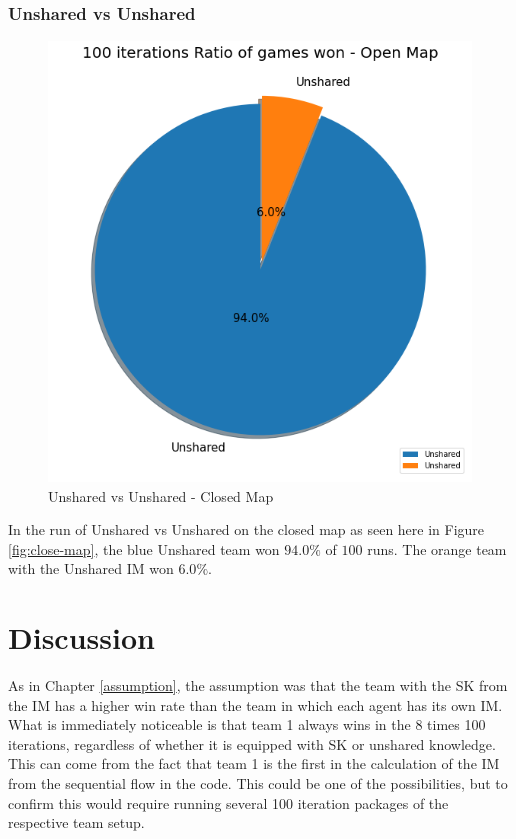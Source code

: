 \documentclass[]{report}
\begin{document}
		\subsection{Unshared vs Unshared}
		\begin{figure}[h!]
			\centering
			\includegraphics[width=0.9\linewidth]{"Images/100 Games Unshared vs Unshared Close Map"}
			\caption[Unshared vs Unshared - Closed Map]{Unshared vs Unshared - Closed Map}
			\label{fig:100-games-unshared-vs-unshared-close-map}
		\end{figure}
			In the run of Unshared vs Unshared on the closed map as seen here in Figure \ref{fig:close-map}, the blue Unshared team won $94.0\%$ of $100$ runs. The orange team with the Unshared \ac{IM} won $6.0\%$.
		
		
		\chapter{Discussion} \label{discussion}
		As in Chapter \ref{assumption}, the assumption was that the team with the \ac{SK} from the \ac{IM} has a higher win rate than the team in which each agent has its own \ac{IM}. \newline
		What is immediately noticeable is that team 1 always wins in the 8 times 100 iterations, regardless of whether it is equipped with \ac{SK} or unshared knowledge. This can come from the fact that team 1 is the first in the calculation of the \ac{IM} from the sequential flow in the code. This could be one of the possibilities, but to confirm this would require running several 100 iteration packages of the respective team setup.
		
\end{document}
